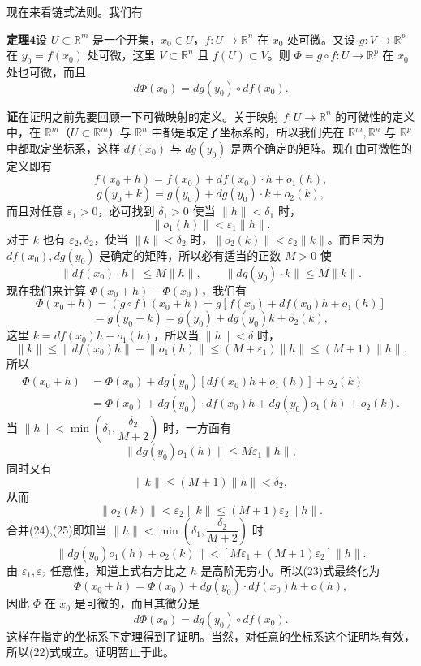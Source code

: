 现在来看链式法则。我们有

\noindent\textbf{定理4}\quad 设 $U\subset\mathbb R^m$ 是一个开集，$x_0\in U$，$f:U\to\mathbb R^n$ 在 $x_0$ 处可微。又设 $g:V\to\mathbb R^p$ 在 $y_0=f(x_0)$ 处可微，这里 $V\subset\mathbb R^n$ 且 $f(U)\subset V$。则 $\Phi=g\circ f:U\to\mathbb R^p$ 在 $x_0$ 处也可微，而且
\begin{equation}
 d\Phi(x_0)=dg(y_0)\circ df(x_0).
 \tag{22}
\end{equation}

\noindent\textbf{证}\quad 在证明之前先要回顾一下可微映射的定义。关于映射 $f:U\to\mathbb R^n$ 的可微性的定义中，在 $\mathbb R^m$（$U\subset\mathbb R^m$）与 $\mathbb R^n$ 中都是取定了坐标系的，所以我们先在 $\mathbb R^m,\mathbb R^n$ 与 $\mathbb R^p$ 中都取定坐标系，这样 $df(x_0)$ 与 $dg(y_0)$ 是两个确定的矩阵。现在由可微性的定义即有
\[
 f(x_0+h)=f(x_0)+df(x_0)\cdot h+o_1(h),
\]
\[
 g(y_0+k)=g(y_0)+dg(y_0)\cdot k+o_2(k),
\]
而且对任意 $\varepsilon_1>0$，必可找到 $\delta_1>0$ 使当 $\lVert h\rVert<\delta_1$ 时，
\[
 \lVert o_1(h)\rVert<\varepsilon_1\lVert h\rVert.
\]
对于 $k$ 也有 $\varepsilon_2,\delta_2$，使当 $\lVert k\rVert<\delta_2$ 时，$\lVert o_2(k)\rVert<\varepsilon_2\lVert k\rVert$。而且因为 $df(x_0),dg(y_0)$ 是确定的矩阵，所以必有适当的正数 $M>0$ 使
\[
 \lVert df(x_0)\cdot h\rVert\le M\lVert h\rVert,\qquad
 \lVert dg(y_0)\cdot k\rVert\le M\lVert k\rVert.
\]
现在我们来计算 $\Phi(x_0+h)-\Phi(x_0)$，我们有
\[
 \Phi(x_0+h)=(g\circ f)(x_0+h)=g[f(x_0)+df(x_0)h+o_1(h)]
\]
\[
 =g(y_0+k)=g(y_0)+dg(y_0)k+o_2(k),
\]
这里 $k=df(x_0)h+o_1(h)$，所以当 $\lVert h\rVert<\delta$ 时，
\[
 \lVert k\rVert\le\lVert df(x_0)h\rVert+\lVert o_1(h)\rVert\le(M+\varepsilon_1)\lVert h\rVert
 \le(M+1)\lVert h\rVert.
\]
所以
\begin{align}
 \Phi(x_0+h)
 &=\Phi(x_0)+dg(y_0)[df(x_0)h+o_1(h)]+o_2(k)\\
 &=\Phi(x_0)+dg(y_0)\cdot df(x_0)h+dg(y_0)o_1(h)+o_2(k).
 \tag{23}
\end{align}
当 $\lVert h\rVert<\min\left(\delta_1,\dfrac{\delta_2}{M+2}\right)$ 时，一方面有
\begin{equation}
 \lVert dg(y_0)o_1(h)\rVert\le M\varepsilon_1\lVert h\rVert,
 \tag{24}
\end{equation}
同时又有
\[
 \lVert k\rVert\le(M+1)\lVert h\rVert<\delta_2,
\]
从而
\begin{equation}
 \lVert o_2(k)\rVert<\varepsilon_2\lVert k\rVert\le(M+1)\varepsilon_2\lVert h\rVert.
 \tag{25}
\end{equation}
合并(24),(25)即知当 $\lVert h\rVert<\min\left(\delta_1,\dfrac{\delta_2}{M+2}\right)$ 时
\[
 \lVert dg(y_0)o_1(h)+o_2(k)\rVert<[M\varepsilon_1+(M+1)\varepsilon_2]\lVert h\rVert.
\]
由 $\varepsilon_1,\varepsilon_2$ 任意性，知道上式右方比之 $h$ 是高阶无穷小。所以(23)式最终化为
\[
 \Phi(x_0+h)=\Phi(x_0)+dg(y_0)\cdot df(x_0)h+o(h),
\]
因此 $\Phi$ 在 $x_0$ 是可微的，而且其微分是
\[
 d\Phi(x_0)=dg(y_0)\circ df(x_0).
\]
这样在指定的坐标系下定理得到了证明。当然，对任意的坐标系这个证明均有效，所以(22)式成立。证明暂止于此。

